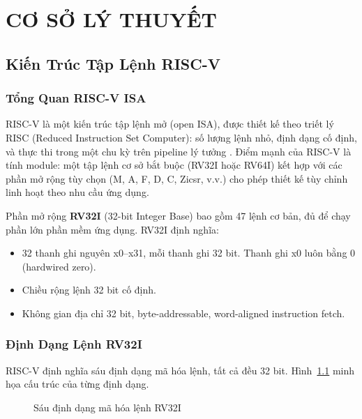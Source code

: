 \chapter{CƠ SỞ LÝ THUYẾT}
\label{Chapter3}

\section{Kiến Trúc Tập Lệnh RISC-V}

\subsection{Tổng Quan RISC-V ISA}

RISC-V là một kiến trúc tập lệnh mở (open ISA), được thiết kế theo triết lý RISC (Reduced Instruction Set Computer): số lượng lệnh nhỏ, định dạng cố định, và thực thi trong một chu kỳ trên pipeline lý tưởng \cite{riscv-spec}. Điểm mạnh của RISC-V là tính module: một tập lệnh cơ sở bắt buộc (RV32I hoặc RV64I) kết hợp với các phần mở rộng tùy chọn (M, A, F, D, C, Zicsr, v.v.) cho phép thiết kế tùy chỉnh linh hoạt theo nhu cầu ứng dụng.

Phần mở rộng \textbf{RV32I} (32-bit Integer Base) bao gồm 47 lệnh cơ bản, đủ để chạy phần lớn phần mềm ứng dụng. RV32I định nghĩa:

\begin{itemize}
    \item 32 thanh ghi nguyên x0--x31, mỗi thanh ghi 32 bit. Thanh ghi x0 luôn bằng 0 (hardwired zero).
    \item Chiều rộng lệnh 32 bit cố định.
    \item Không gian địa chỉ 32 bit, byte-addressable, word-aligned instruction fetch.
\end{itemize}

\subsection{Định Dạng Lệnh RV32I}

RISC-V định nghĩa sáu định dạng mã hóa lệnh, tất cả đều 32 bit. Hình~\ref{fig:riscv-formats} minh họa cấu trúc của từng định dạng.

\begin{figure}[htp]
\centering
{}
\caption{Sáu định dạng mã hóa lệnh RV32I}
\label{fig:riscv-formats}
\end{figure}

